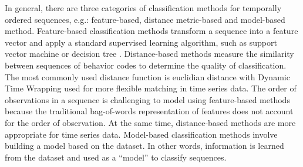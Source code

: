 \documentclass{amia_summit_2018}
\begin{document}

In general, there are three categories of classification methods for temporally ordered sequences, e.g.: feature-based, distance metric-based and model-based method. Feature-based classification methods transform a sequence into a feature vector and apply a standard supervised learning algorithm, such as support vector machine \cite{leslie2004fast} or decision tree \cite{chuzhanova1998feature}. 
Distance-based methods measure the similarity between sequences of behavior codes to determine the quality of classification. The most commonly used distance function is euclidian distance with Dynamic Time Wrapping \cite{keogh2000scaling} used for more flexible matching in time series data.  
The order of observations in a sequence is challenging to model using feature-based methods because the traditional bag-of-words representation of features does not account for the order of observation. At the same time, distance-based methods are more appropriate for time series data. Model-based classification methods involve building a model based on the dataset. In other words, information is learned from the dataset and used as a ``model'' to classify sequences.  

\end{document}
